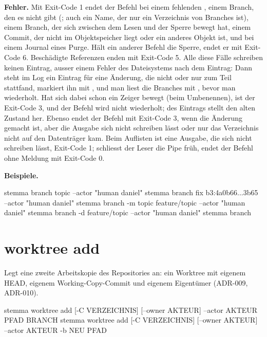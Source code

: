 {\bf Fehler.} Mit Exit-Code 1 endet der Befehl bei einem fehlenden , einem Branch,
den es nicht gibt (; auch ein Name, der nur ein Verzeichnis von
Branches ist), einem Branch, der sich zwischen dem Lesen und der Sperre bewegt hat, einem
Commit, der nicht im Objektspeicher liegt oder ein anderes Objekt ist, und bei einem Journal
eines Purge. Hält ein anderer Befehl die Sperre, endet er mit Exit-Code 6. Beschädigte Referenzen
enden mit Exit-Code 5. Alle diese Fälle schreiben keinen Eintrag, ausser einem Fehler des
Dateisystems nach dem Eintrag: Dann steht im Log ein Eintrag für eine Änderung, die nicht oder
nur zum Teil stattfand,  markiert ihn mit \type{!}, und man liest die Branches mit
, bevor man wiederholt. Hat sich dabei schon ein Zeiger bewegt (beim
Umbenennen), ist der Exit-Code 3, und der Befehl wird nicht wiederholt;  des
Eintrags stellt den alten Zustand her. Ebenso endet der Befehl mit Exit-Code 3, wenn die
Änderung gemacht ist, aber die Ausgabe sich nicht schreiben lässt oder nur das Verzeichnis nicht
auf den Datenträger kam. Beim Auflisten ist eine Ausgabe, die sich nicht schreiben lässt,
Exit-Code 1; schliesst der Leser die Pipe früh, endet der Befehl ohne Meldung mit Exit-Code 0.

{\bf Beispiele.}

\starttyping
stemma branch topic --actor "human daniel"
stemma branch fix b3:4a0b66...3b65 --actor "human daniel"
stemma branch -m topic feature/topic --actor "human daniel"
stemma branch -d feature/topic --actor "human daniel"
stemma branch
\stoptyping

\section{worktree add}

Legt eine zweite Arbeitskopie des Repositories an: ein Worktree mit eigenem HEAD, eigenem
Working-Copy-Commit und eigenem Eigentümer (ADR-009, ADR-010).

\starttyping
stemma worktree add [-C VERZEICHNIS] [--owner AKTEUR] --actor AKTEUR PFAD BRANCH
stemma worktree add [-C VERZEICHNIS] [--owner AKTEUR] --actor AKTEUR -b NEU PFAD
\stoptyping

